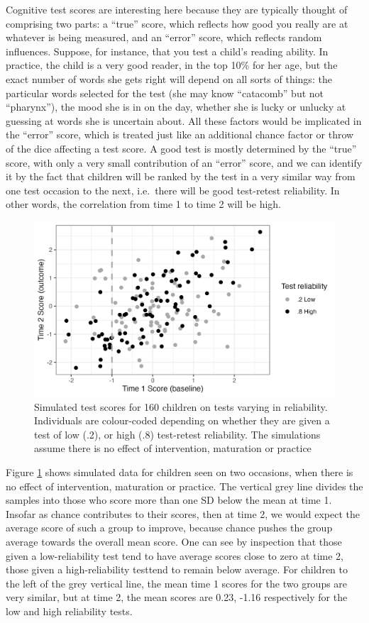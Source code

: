 \documentclass{krantz}
\begin{document}
Cognitive test scores are interesting here because they are typically thought of comprising two parts: a ``true'' score, which reflects how good you really are at whatever is being measured, and an ``error'' score, which reflects random influences. Suppose, for instance, that you test a child's reading ability. In practice, the child is a very good reader, in the top 10\% for her age, but the exact number of words she gets right will depend on all sorts of things: the particular words selected for the test (she may know ``catacomb'' but not ``pharynx''), the mood she is in on the day, whether she is lucky or unlucky at guessing at words she is uncertain about. All these factors would be implicated in the ``error'' score, which is treated just like an additional chance factor or throw of the dice affecting a test score. A good test is mostly determined by the ``true'' score, with only a very small contribution of an ``error'' score, and we can identify it by the fact that children will be ranked by the test in a very similar way from one test occasion to the next, i.e.~there will be good test-retest reliability. In other words, the correlation from time 1 to time 2 will be high.

\begin{figure}
\includegraphics[width=0.75\linewidth]{images_bw/reg2mean} \caption{Simulated test scores for 160 children on tests varying in reliability. Individuals are colour-coded depending on whether they are given a test of low (.2), or high (.8) test-retest reliability. The simulations assume there is no effect of intervention, maturation or practice}\label{fig:reg2mean}
\end{figure}

Figure \ref{fig:reg2mean} shows simulated data for children seen on two occasions, when there is no effect of intervention, maturation or practice. The vertical grey line divides the samples into those who score more than one SD below the mean at time 1. Insofar as chance contributes to their scores, then at time 2, we would expect the average score of such a group to improve, because chance pushes the group average towards the overall mean score. One can see by inspection that those given a low-reliability test tend to have average scores close to zero at time 2, those given a high-reliability testtend to remain below average. For children to the left of the grey vertical line, the mean time 1 scores for the two groups are very similar, but at time 2, the mean scores are 0.23, -1.16 respectively for the low and high reliability tests.
\end{document}
